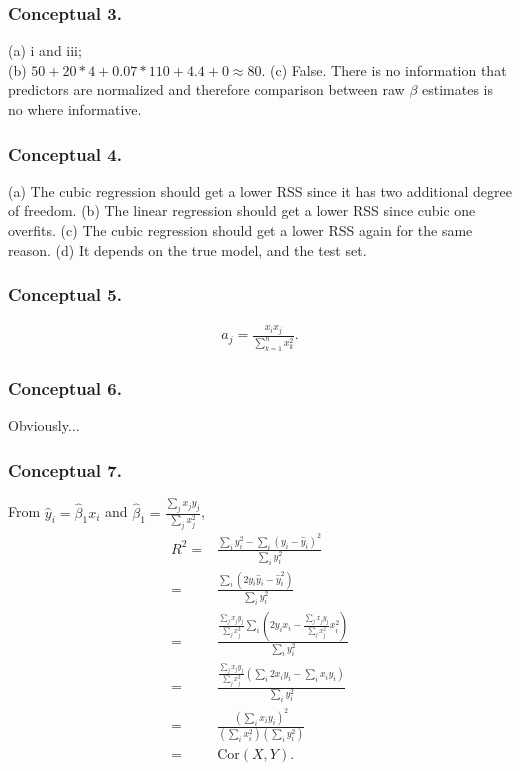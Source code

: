 \subsubsection{Conceptual 3.}
(a) i and iii;\\
(b) $50 + 20* 4 + 0.07*110 + 4.4 + 0 \approx 80$.
(c) False. There is no information that predictors are normalized and therefore comparison between raw $\beta$ estimates is no where informative.
\subsubsection{Conceptual 4.}
(a) The cubic regression should get a lower RSS since it has two additional degree of freedom.
(b) The linear regression should get a lower RSS since cubic one overfits.
(c) The cubic regression should get a lower RSS again for the same reason.
(d) It depends on the true model, and the test set.
\subsubsection{Conceptual 5.}
\begin{align}
a_j = \frac{x_ix_j}{\sum_{k=1}^{n}x_k^2}.
\end{align}
\subsubsection{Conceptual 6.}
Obviously...
\subsubsection{Conceptual 7.}
From $\hat{y}_i = \hat{\beta}_1 x_i$ and $ \hat{\beta}_1 = \frac{\sum_j x_jy_j}{\sum_j x_j^2}$,
\begin{align}
R^2 = &\frac{\sum_i y_i^2 - \sum_i(y_i - \hat{y}_i)^2}{\sum_i y_i^2} \\
 	= &\frac{\sum_i (2y_i\hat{y}_i -\hat{y}_i^2)}{\sum_i y_i^2} \\
 	= &\frac{\frac{\sum_j x_jy_j}{\sum_j x_j^2}\sum_i (2y_ix_i - \frac{\sum_j x_jy_j}{\sum_j x_j^2}x_i^2)}{\sum_i y_i^2} \\
 	= &\frac{\frac{\sum_j x_jy_j}{\sum_j x_j^2} (\sum_i 2x_iy_i -\sum_i x_iy_i)}{\sum_i y_i^2} \\
 	= &\frac{(\sum_i x_iy_i)^2}{(\sum_i x_i^2)(\sum_i y_i^2)} \\
 	= &\text{Cor}(X, Y).
\end{align}
